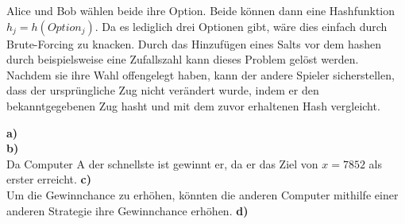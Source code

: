 \documentclass[german]{../uebung}
\begin{document}
\begin{exercise}{3}
    Alice und Bob wählen beide ihre Option. Beide können dann eine Hashfunktion \(h_j=h(Option_j)\). Da es lediglich drei Optionen gibt, wäre dies einfach durch Brute-Forcing zu knacken. Durch das Hinzufügen eines Salts vor dem hashen durch beispielsweise eine Zufallszahl kann dieses Problem gelöst werden. Nachdem sie ihre Wahl offengelegt haben, kann der andere Spieler sicherstellen, dass der ursprüngliche Zug nicht verändert wurde, indem er den bekanntgegebenen Zug hasht und mit dem zuvor erhaltenen Hash vergleicht.\\
\end{exercise}
\begin{exercise}{4}
    \textbf{a)}\\
    \textbf{b)}\\
    Da Computer A der schnellste ist gewinnt er, da er das Ziel von \(x=7852\) als erster erreicht.
    \textbf{c)}\\
    Um die Gewinnchance zu erhöhen, könnten die anderen Computer mithilfe einer anderen Strategie ihre Gewinnchance erhöhen.
    \textbf{d)}\\
\end{exercise}
\begin{exercise}{5}

\end{exercise}
\end{document}

